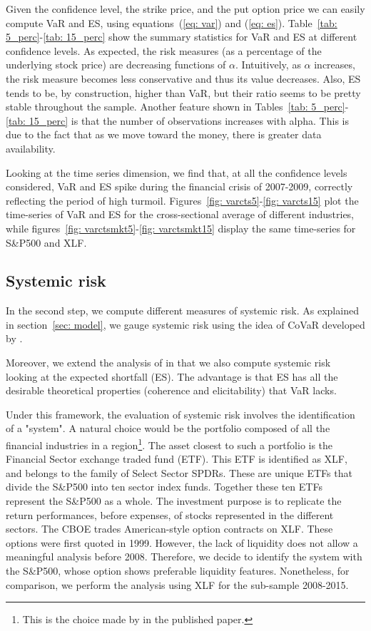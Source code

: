 \documentclass[11pt,a4paper,english]{article}
\begin{document}
Given the confidence level, the strike price, and the put option price we can easily compute VaR and ES, using equations~(\ref{eq: var}) and (\ref{eq: es}). Table~\ref{tab: 5_perc}-\ref{tab: 15_perc} show the summary statistics for VaR and ES at different confidence levels. As expected, the risk measures (as a percentage of the underlying stock price) are decreasing functions of $\alpha$. Intuitively, as $\alpha$ increases, the risk measure becomes less conservative and thus its value decreases. Also, ES tends to be, by construction, higher than VaR, but their ratio seems to be pretty stable throughout the sample. Another feature shown in Tables~\ref{tab: 5_perc}-\ref{tab: 15_perc} is that the number of observations increases with alpha. This is due to the fact that as we move toward the money, there is greater data availability. 

Looking at the time series dimension, we find that, at all the confidence levels considered, VaR and ES spike during the financial crisis of 2007-2009, correctly reflecting the period of high turmoil. Figures~\ref{fig: varcts5}-\ref{fig: varcts15} plot the time-series of VaR and ES for the cross-sectional average of different industries, while figures~\ref{fig: varctsmkt5}-\ref{fig: varctsmkt15} display the same time-series for S\&P500 and XLF.

\subsection{Systemic risk}
\label{sec: sysri emp}
In the second step, we compute different measures of systemic risk. As explained in section~\ref{sec: model}, we gauge systemic risk using the idea of CoVaR developed by \citet{Adrian2016}.

Moreover, we extend the analysis of \citet{Adrian2016} in that we also compute systemic risk looking at the expected shortfall (ES). The advantage is that ES has all the desirable theoretical properties (coherence and elicitability) that VaR lacks.

Under this framework, the evaluation of systemic risk involves the identification of a "system". A natural choice would be the portfolio composed of all the financial industries in a region\footnote{This is the choice made by \cite{Adrian2016} in the published paper.}. The asset closest to such a portfolio is the Financial Sector exchange traded fund (ETF). This ETF is identified as XLF, and belongs to the family of Select Sector SPDRs. These are unique ETFs that divide the S\&P500 into ten sector index funds. Together these ten ETFs represent the S\&P500 as a whole. The investment purpose is to replicate the return performances, before expenses, of stocks represented in the different sectors. The CBOE trades American-style option contracts on XLF. These options were first quoted in 1999. However, the lack of liquidity does not allow a meaningful analysis before 2008. Therefore, we decide to identify the system with the S\&P500, whose option shows preferable liquidity features. Nonetheless, for comparison, we perform the analysis using XLF for the sub-sample 2008-2015.
\end{document}
